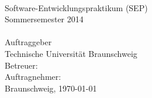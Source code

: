 \begin{titlepage}
\begin{center}
{}\\[5ex]

Software-Entwicklungspraktikum (SEP)\\
Sommersemester 2014\\[6ex]

{}\\[5ex]

Auftraggeber\\
Technische Universität Braunschweig\\
\institut[2ex]
Betreuer: \betreuer\\[5ex]

Auftragnehmer:\\


\vfill
Braunschweig, \today

\end{center}
\end{titlepage}
